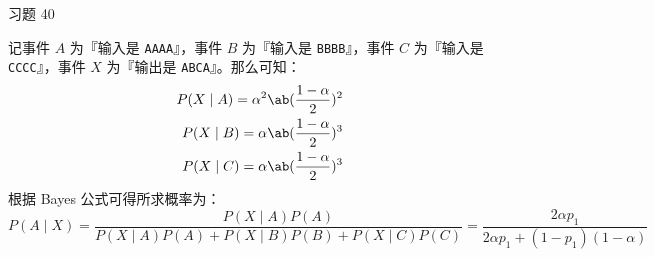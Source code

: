 \begin{problem}
    习题 40
    \begin{solution}
        记事件 $A$ 为『输入是 \texttt{AAAA}』，事件 $B$ 为『输入是 \texttt{BBBB}』，事件 $C$ 为『输入是 \texttt{CCCC}』，事件 $X$ 为『输出是 \texttt{ABCA}』。那么可知：
        $$
        \begin{aligned}
            P(X \mid A) = \alpha^2 \ab(\frac{1 - \alpha}{2})^2 \\
            P(X \mid B) = \alpha \ab(\frac{1 - \alpha}{2})^3 \\
            P(X \mid C) = \alpha \ab(\frac{1 - \alpha}{2})^3 \\
        \end{aligned}
        $$
        根据 Bayes 公式可得所求概率为：
        $$
        P(A \mid X) = \frac{P(X \mid A) P(A)}{P(X \mid A) P(A) + P(X \mid B) P(B) + P(X \mid C) P(C)} = \frac{2 \alpha p_1}{2 \alpha p_1 + (1 - p_1) (1 - \alpha)}
        $$
    \end{solution}
\end{problem}